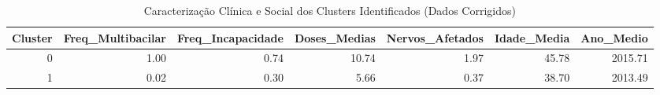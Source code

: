 \begin{table}
\caption{Caracterização Clínica e Social dos Clusters Identificados (Dados Corrigidos)}
\label{tab:perfil_clusters}
\begin{tabular}{rrrrrrr}
\toprule
Cluster & Freq_Multibacilar & Freq_Incapacidade & Doses_Medias & Nervos_Afetados & Idade_Media & Ano_Medio \\
\midrule
0 & 1.00 & 0.74 & 10.74 & 1.97 & 45.78 & 2015.71 \\
1 & 0.02 & 0.30 & 5.66 & 0.37 & 38.70 & 2013.49 \\
\bottomrule
\end{tabular}
\end{table}
